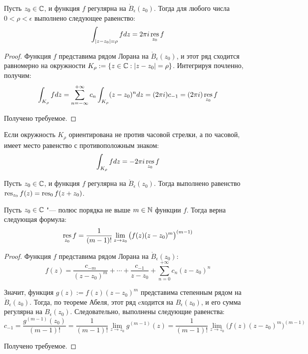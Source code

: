\begin{proposition}
	Пусть $z_0 \in \mathbb{C}$, и функция $f$ регулярна на $\mathring B_\epsilon(z_0)$. Тогда для любого числа $0 < \rho < \epsilon$ выполнено следующее равенство:
	\[\int_{|z - z_0| = \rho}fdz = 2\pi i\operatorname*{res}_{z_0}f\]
\end{proposition}

\begin{proof}
	Функция $f$ представима рядом Лорана на $\mathring B_\epsilon(z_0)$, и этот ряд сходится равномерно на окружности $K_\rho:= \{z \in \mathbb{C}: |z - z_0| = \rho\}$. Интегрируя почленно, получим:
	\[\int_{K_\rho}fdz = \sum\limits_{n = -\infty}^{+\infty}c_n\int_{K_\rho}(z-z_0)^ndz = (2\pi i)c_{-1} = (2\pi i)\operatorname*{res}_{z_0}f\]
	
	Получено требуемое.
\end{proof}

\begin{note}
	Если окружность $K_\rho$ ориентирована не против часовой стрелки, а по часовой, имеет место равенство с противоположным знаком:
	\[\int_{K_\rho}fdz = -2\pi i\operatorname*{res}_{z_0}f\]
\end{note}

\begin{note}
	Пусть $z_0 \in \mathbb{C}$, и функция $f$ регулярна на $\mathring B_\epsilon(z_0)$. Тогда выполнено равенство $\operatorname*{res}_{z_0}f(z) = \operatorname*{res}_0f(z + z_0)$.
\end{note}

\begin{proposition}
	Пусть $z_0 \in \mathbb{C}$ "--- полюс порядка не выше $m \in \mathbb{N}$ функции $f$. Тогда верна следующая формула:
	\[\operatorname*{res}_{z_0}f = \frac{1}{(m-1)!}\lim_{z \to z_0}\big(f(z)(z - z_0)^m\big)^{(m-1)}\]
\end{proposition}

\begin{proof}
	Функция $f$ представима рядом Лорана на $\mathring B_\epsilon(z_0)$:
	\[f(z) = \frac{c_{-m}}{(z-z_0)^m} + \dotsb + \frac{c_{-1}}{z-z_0} + \sum_{n = 0}^{+\infty}c_n(z - z_0)^n\]
	
	Значит, функция $g(z) := f(z)(z-z_0)^m$ представима степенным рядом на $\mathring B_\epsilon(z_0)$. Тогда, по теореме Абеля, этот ряд cходится на $B_\epsilon(z_0)$, и его сумма регулярна на $B_\epsilon(z_0)$. Следовательно, выполнены следующие равенства:
	\[c_{-1} = \frac{g^{(m-1)}(z_0)}{(m-1)!} = \frac1{{(m-1)!}}\lim_{z \to z_0}g^{(m-1)}(z) = \frac{1}{(m-1)!}\lim_{z \to z_0}\big(f(z)(z - z_0)^m\big)^{(m-1)}\]
	
	Получено требуемое.
\end{proof}

